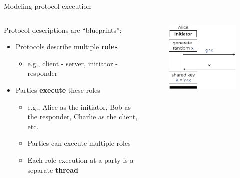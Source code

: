 \documentclass[11pt,aspectratio=169]{beamer}
\begin{document}
\begin{frame}[fragile]{Modeling protocol execution}
    \begin{columns}
        \begin{column}{0.6\textwidth}
            Protocol descriptions are ``blueprints'':
            \begin{itemize}
                \item Protocols describe multiple  \textbf{roles}
                \begin{itemize}
                    \item e.g., client - server, initiator - responder
                \end{itemize}
                \item Parties \textbf{execute} these roles
                \begin{itemize}
                    \item e.g., Alice as the initiator, Bob as the responder, 
                          Charlie as the client, etc.
                    \item Parties can execute multiple roles
                    \item Each role execution at a party is a separate
                          \textbf{thread}
                \end{itemize}
            \end{itemize}
        \end{column}
        \begin{column}[c]{0.4\textwidth}
            \begin{figure}
                \includegraphics[width=\textwidth]{./figures/lecture_2/dh_a}%
            \end{figure}
        \end{column}
    \end{columns}
\end{frame}
\end{document}
